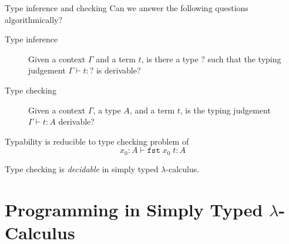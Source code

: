 \begin{frame}{Type inference and checking}
  Can we answer the following questions algorithmically?
  \begin{description}
    \item[Type inference] Given a context $\Gamma$ and a term $t$, is there a type $?$
      such that the typing judgement $\Gamma \vdash t : ?$ is derivable? 
    \item[Type checking] Given a context $\Gamma$, a type $A$, and a term $t$, is the typing judgement $\Gamma \vdash t : A$ derivable?
  \end{description}
  
  Typability is reducible to type checking problem of
  \[
    x_0: A \vdash \mathtt{fst} \;x_0\;t : A
  \]

  \begin{theorem}
    Type checking is \emph{decidable} in simply typed $\lambda$-calculus.
  \end{theorem}
  
\end{frame}

\section{Programming in Simply Typed \texorpdfstring{$\lambda$}{λ}-Calculus}

